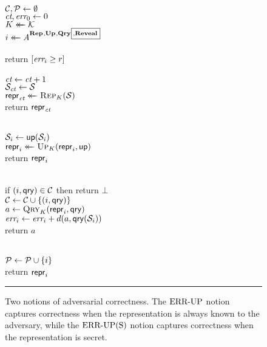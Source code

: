 \newcommand{\REVO}{\mathbf{Reveal}}
\def\ticks(#1,#2){\procfont{T}_{\hspace*{-1.5pt}#1}({#2})}

\begin{figure}[t]
  {
     \\[2pt]
      $\mathcal{C},\mathcal{P} \gets \emptyset$\\
      $\textit{ct},\textit{err}_0 \gets 0$ \\
      $K \mathrel{\leftarrow\mkern-14mu\leftarrow} \mathcal{K}$\\
      $i \getsr \advA^{\REPO,\UPO,\QRYO{\scriptsize\boxed{\!,\!\REVO}}}$\\
       \\
      return $[\textit{err}_i \geq r]$ 
    \\[6pt]
    \oraclev{$\REPO(\col)$}\\[2pt]
      $\textit{ct}\gets\textit{ct}+1$ \\
      $\mathcal{S}_{\textit{ct}} \gets \mathcal{S}$\\
      $\mathsf{repr}_{\textit{ct}} \mathrel{\leftarrow\mkern-14mu\leftarrow} \textsc{Rep}_K(\mathcal{S})$\\
      return $\mathsf{repr}_{\textit{ct}}$   }
  {
    \\[2pt]
      $\mathcal{S}_i \gets \mathsf{up}(\mathcal{S}_i)$\\
      $\mathsf{repr}_i \mathrel{\leftarrow\mkern-14mu\leftarrow} \textsc{Up}_K(\mathsf{repr}_i, \mathsf{up})$\\
      return $\mathsf{repr}_i$ 
      \medskip

    \\[2pt]
      if $(i,\mathsf{qry}) \in \mathcal{C}$ then return $\bot$\\
      $\mathcal{C} \gets \mathcal{C} \cup \{(i,\mathsf{qry})\}$\\
      $a \gets \textsc{Qry}_K(\mathsf{repr}_i, \mathsf{qry})$\\
      $\textit{err}_i \gets \textit{err}_i + d(a,\mathsf{qry}(\mathcal{S}_i))$\\
      return $a$
      \medskip

    \oraclev{$\REVO(i)$}\\[2pt]
     $\mathcal{P} \gets \mathcal{P} \cup \{i\}$ \\
      return $\mathsf{repr}_i$
  }
  \caption{Two notions of adversarial correctness. The $\textnormal{ERR\mbox{-}UP}$ notion captures correctness when the representation is always known to the adversary, while the $\textnormal{ERR\mbox{-}UP(S)}$ notion captures correctness when the representation is secret.}
  \vspace{6pt}\hrule
  \label{fig:security}
\end{figure}


